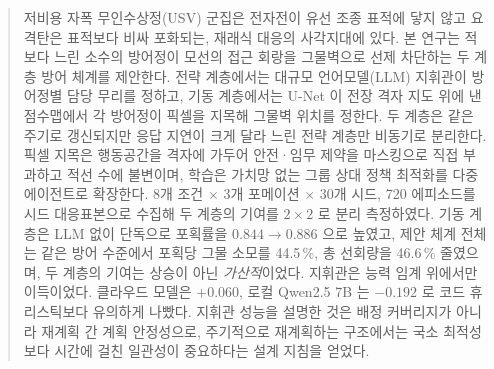 \begin{abstract}
\noindent
저비용 자폭 무인수상정(USV) 군집은 전자전이 유선 조종 표적에 닿지 않고 요격탄은 표적보다
비싸 포화되는, 재래식 대응의 사각지대에 있다. 본 연구는 적보다 느린 소수의 방어정이 모선의
접근 회랑을 그물벽으로 선제 차단하는 두 계층 방어 체계를 제안한다. 전략 계층에서는 대규모
언어모델(LLM) 지휘관이 방어정별 담당 무리를 정하고, 기동 계층에서는 U-Net 이 전장 격자
지도 위에 낸 점수맵에서 각 방어정이 픽셀을 지목해 그물벽 위치를 정한다. 두 계층은 같은
주기로 갱신되지만 응답 지연이 크게 달라 느린 전략 계층만 비동기로 분리한다. 픽셀 지목은
행동공간을 격자에 가두어 안전·임무 제약을 마스킹으로 직접 부과하고 적선 수에 불변이며,
학습은 가치망 없는 그룹 상대 정책 최적화를 다중 에이전트로 확장한다. 8개 조건 $\times$ 3개 포메이션 $\times$ 30개 시드, 720 에피소드를
시드 대응표본으로 수집해 두 계층의 기여를 $2\times2$ 로 분리 측정하였다. 기동 계층은 LLM
없이 단독으로 포획률을 $0.844 \to 0.886$ 으로 높였고, 제안 체계 전체는 같은 방어 수준에서
포획당 그물 소모를 44.5\,\%, 총 선회량을 46.6\,\% 줄였으며, 두 계층의 기여는 상승이 아닌
\emph{가산적}이었다. 지휘관은 능력 임계 위에서만 이득이었다. 클라우드 모델은 $+0.060$,
로컬 Qwen2.5 7B 는 $-0.192$ 로 코드 휴리스틱보다 유의하게 나빴다. 지휘관 성능을 설명한 것은
배정 커버리지가 아니라 재계획 간 계획 안정성으로, 주기적으로 재계획하는 구조에서는 국소
최적성보다 시간에 걸친 일관성이 중요하다는 설계 지침을 얻었다.
\end{abstract}
